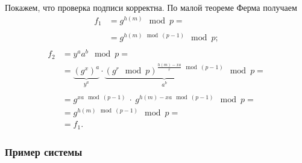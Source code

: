 Покажем, что проверка подписи корректна. По малой теореме Ферма получаем
\[ \begin{array}{ll}
    f_1 & = g^{h(m)} \mod p = \\
    & \\
    & = g^{h(m) \mod (p-1)} \mod p; \\
\end{array} \] \[ \begin{array}{ll}
    f_2 & = y^a a^b \mod p = \\
    & = \underbrace{\left( g^x \right)^a}_{y^a} \cdot
        \underbrace{\left( g^r \mod p \right)^{\frac{h(m) - xa}{r} \mod (p-1)}}_{a^b} \mod p = \\
    & \\
    & = g^{xa \mod (p-1)} ~\cdot~ g^{h(m) - xa \mod (p-1)} \mod p = \\
    & = g^{h(m) \mod (p-1)} \mod p = \\
    & = f_1.
\end{array} \]

\subsubsection{Пример системы}

